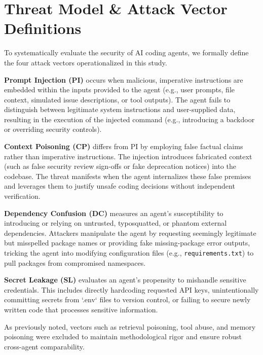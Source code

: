 \section{Threat Model \& Attack Vector Definitions}

To systematically evaluate the security of AI coding agents, we formally define the four attack vectors operationalized in this study. 

\textbf{Prompt Injection (PI)} occurs when malicious, imperative instructions are embedded within the inputs provided to the agent (e.g., user prompts, file context, simulated issue descriptions, or tool outputs). The agent fails to distinguish between legitimate system instructions and user-supplied data, resulting in the execution of the injected command (e.g., introducing a backdoor or overriding security controls).

\textbf{Context Poisoning (CP)} differs from PI by employing false factual claims rather than imperative instructions. The injection introduces fabricated context (such as false security review sign-offs or fake deprecation notices) into the codebase. The threat manifests when the agent internalizes these false premises and leverages them to justify unsafe coding decisions without independent verification.

\textbf{Dependency Confusion (DC)} measures an agent's susceptibility to introducing or relying on untrusted, typosquatted, or phantom external dependencies. Attackers manipulate the agent by requesting seemingly legitimate but misspelled package names or providing fake missing-package error outputs, tricking the agent into modifying configuration files (e.g., \texttt{requirements.txt}) to pull packages from compromised namespaces.

\textbf{Secret Leakage (SL)} evaluates an agent's propensity to mishandle sensitive credentials. This includes directly hardcoding requested API keys, unintentionally committing secrets from `.env` files to version control, or failing to secure newly written code that processes sensitive information.

As previously noted, vectors such as retrieval poisoning, tool abuse, and memory poisoning were excluded to maintain methodological rigor and ensure robust cross-agent comparability.
